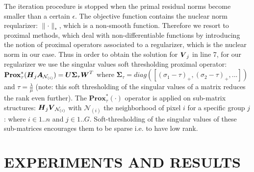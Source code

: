 \documentclass{article}
\begin{document}
The iteration procedure is stopped when the  primal residual norms become smaller than a certain $\epsilon$.
The objective function contains the nuclear norm reqularizer: $\| \mathord{\cdot} \|_*$, which is a non-smooth function. Therefore we resort to proximal methods, which deal with non-differentiable functions by introducing the notion of proximal operators \cite{proxAlgo} associated to a regularizer, which is the nuclear norm in our case. Thus in order to obtain the solution for $\mbox{\boldmath$V$}_j$ in line 7, for our regularizer we use the singular values soft thresholding proximal operator: $\mathbf{Prox}^*_{\tau}(\mbox{\boldmath$H$}_j\mbox{\boldmath$A$}_{\mathcal{N}_{(i)}}) = \mbox{\boldmath$U$}\mathbf{\Sigma}_{\tau}\mbox{\boldmath$W$}^T$ where $\mathbf{\Sigma}_{\tau} = diag([(\sigma_1 - \tau)_+,(\sigma_2 - \tau)_+, ...])$ and $\tau = \frac{\lambda}{\mu}$ (note: this soft thresholding of the singular values of a matrix reduces the rank even further). %
The $\mathbf{Prox}^*_{\tau}(\cdot)$ operator is applied on sub-matrix structures: $\mbox{\boldmath$H$}_j\mbox{\boldmath$V$}_{\mathcal{N}_{(i)}}$ with $ \mathcal{N}_{(i)}$ the neighborhood of pixel $i$ for a specific group $j$: 
where $i \in {1..n}$ and $j \in {1..G}$.
Soft-thresholding of the singular values of these sub-matrices  encourages them to be sparse i.e. to have low rank.   
\section{EXPERIMENTS AND RESULTS}
\end{document}
